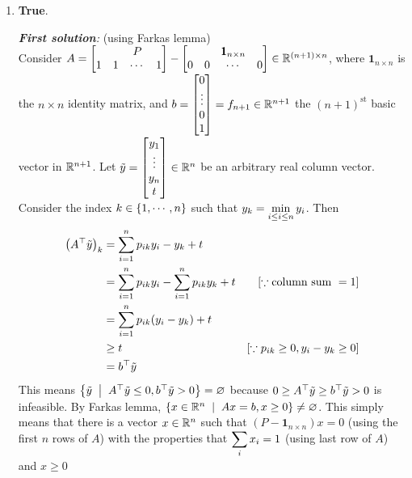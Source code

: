 \begin{enumerate}[leftmargin=*]
\item \textbf{True}.

\textit{\textbf{First solution}:} (using Farkas lemma) \\
Consider $A=\begin{bmatrix}& &P\\1 & 1 & \cdots &1 \end{bmatrix} - \begin{bmatrix}&&\pmb 1_{{n\times n}}\\0 & 0 & \cdots &0 \end{bmatrix}\in\mathbb{R}^{(n+1)\times n}$, where $\pmb 1_{n\times n}$ is the $n\times n$ identity matrix, and $b = \begin{bmatrix}0\\\vdots\\0\\1\end{bmatrix}=f_{n+1}\in\mathbb{R}^{n+1}$ the $(n+1)^{\text{st}}$ basic vector in $\mathbb{R}^{n+1}$. Let ${\tilde{y}} = \begin{bmatrix}y_{1}\\\vdots\\y_{n}\\t\end{bmatrix}\in \mathbb{R}^{n}$ be an arbitrary real column vector. Consider the index $k\in\left\{1,\cdots,n\right\}$ such that $\displaystyle y_{k} = \min_{i\le i\le n}y_{i}$. Then \begin{align*}
\left(A^{\top}{\tilde{y}}\right)_{k} &= \sum_{i=1}^{n} p_{ik}y_{i} - y_{k} + t\\
&= \sum_{i=1}^{n} p_{ik}y_{i} - \sum_{i=1}^{n} p_{ik}y_{k} + t &[\because\text{column sum }=1]\\
&= \sum_{i=1}^{n} p_{ik}(y_{i}-y_{k}) + t\\
&\ge t &[\because p_{ik}\ge 0, y_{i}-y_{k}\ge 0]\\
&= b^{\top}{\tilde{y}}
\end{align*}
This means $\set{\ty\st A^{\top}\ty\le 0, b^{\top}\ty >0} = \varnothing$ because $0\ge A^{\top}{\tilde{y}}\ge b^{\top}{\tilde{y}} >0$ is infeasible. By Farkas lemma, $\set{x\in\R^{n}\st Ax=b, x\ge 0}\ne \varnothing$. This simply means that there is a vector $x\in\mathbb{R}^{n}$ such that $(P-\pmb 1_{n\times n})x = 0$ (using the first $n$ rows of $A$) with the properties that $\displaystyle\sum_{i}x_{i}=1$ (using last row of $A$) and $x\ge 0$


\end{enumerate}
